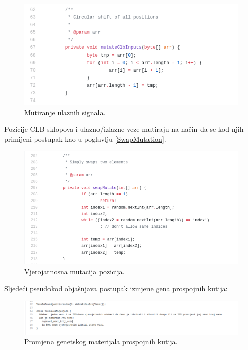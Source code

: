 \documentclass[times, utf8, zavrsni]{fer}
\begin{document}
\begin{figure}[H]
	\centering
	\includegraphics[width=18cm]{slike/circularShift.png}
	\caption{Mutiranje ulaznih signala.}
	\label{fig:sw-boxes-inputs-mutation}
\end{figure} 

Pozicije CLB sklopova i ulazno/izlazne veze mutiraju na način da se kod njih primijeni postupak kao u poglavlju \ref{SwapMutation}.

\begin{figure}[H]
	\centering
	\includegraphics[width=18cm]{slike/swapMutate.png}
	\caption{Vjerojatnosna mutacija pozicija. }
	\label{fig:sw-boxes-mutation}
\end{figure} 

Sljedeći pseudokod objašnjava postupak izmjene gena prospojnih kutija: 

\begin{figure}[H]
	\centering
	\includegraphics[width=18cm]{slike/pseudokod.png}
	\caption{Promjena genetskog materijala prospojnih kutija.}
	\label{fig:pseudokod-prospojne}
\end{figure} 
\end{document}
